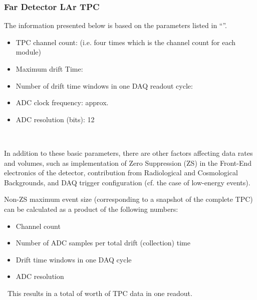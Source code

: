 
\subsubsection{Far Detector LAr TPC}
The information presented below is based on the parameters listed in
``\anxrates''.
\begin{itemize}
\item TPC channel count: \dunenumberchannels (i.e. four times
  \daqchannelspermodule which is the channel count for each \tpcmodulemass module)
\item Maximum drift Time: \tpcdrifttime
\item Number of drift time windows in one DAQ readout cycle: \daqdriftsperreadout
\item ADC clock frequency: approx. \daqsamplerate
\item ADC resolution (bits): 12
\end{itemize}
\

In addition to these basic parameters, there are other factors affecting data rates and volumes, such as
implementation of Zero Suppression (ZS)  in the Front-End electronics of the detector, contribution from
Radiological and Cosmological Backgrounds, and DAQ trigger configuration (cf. the case of low-energy events).

Non-ZS maximum event size (corresponding to a snapshot of the complete TPC) can be calculated as a product of the following numbers:
\begin{itemize}
\item Channel count
\item Number of ADC samples per total drift (collection) time
\item Drift time windows in one DAQ cycle
\item ADC resolution
\end{itemize}
\
This results in a total of \dunefsreadoutsize worth of TPC data in one readout.

